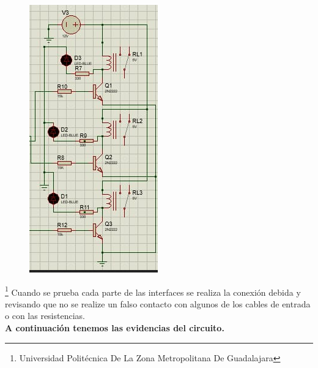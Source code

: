 \documentclass[10pt,a4paper]{article}
\begin{document}
\begin{figure}[hbtp]
\centering
\includegraphics[scale=0.60]{salida.png} 
\end{figure}

\footnote{Universidad Politécnica De La Zona Metropolitana De Guadalajara}
\newpage
Cuando se prueba cada parte de las interfaces se realiza la conexión debida y revisando que no se realize un falso contacto con algunos de los cables de entrada o con las resistencias.\\ \textbf{A continuación tenemos las evidencias del circuito.}
\end{document}
